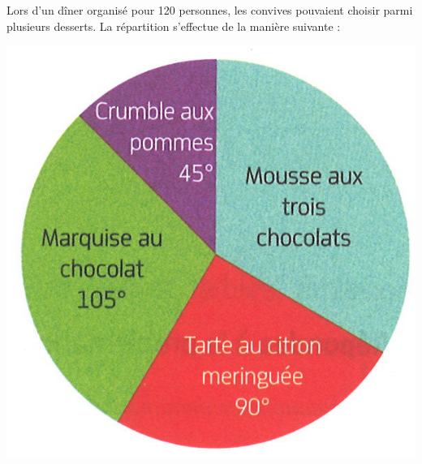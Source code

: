 \documentclass[a4paper,11pt]{exam}
\begin{document}
	\begin{multicols}{2}
		\ \\
		\ \\
		Lors d'un dîner organisé pour 120 personnes, les convives pouvaient choisir parmi plusieurs desserts. La répartition s'effectue de la manière suivante :
		
		\includegraphics[scale=0.8]{./secteurs}
		
		
	\end{multicols}
	 
\end{document}
